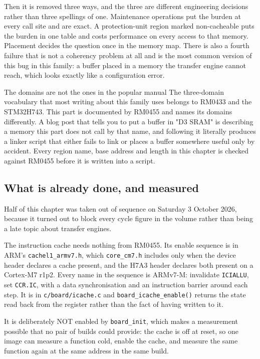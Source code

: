 Then it is removed three ways, and the three are different engineering
decisions rather than three spellings of one. Maintenance operations put the
burden at every call site and are exact. A protection-unit region marked
non-cacheable puts the burden in one table and costs performance on every
access to that memory. Placement decides the question once in the memory map.
There is also a fourth failure that is not a coherency problem at all and is
the most common version of this bug in this family: a buffer placed in a memory
the transfer engine cannot reach, which looks exactly like a configuration
error.

\begin{note}{The domains are not the ones in the popular manual}
The three-domain vocabulary that most writing about this family uses belongs to
RM0433 and the STM32H743. This part is documented by RM0455 and names its
domains differently. A blog post that tells you to put a buffer in "D3 SRAM"
is describing a memory this part does not call by that name, and following it
literally produces a linker script that either fails to link or places a buffer
somewhere useful only by accident. Every region name, base address and length
in this chapter is checked against RM0455 before it is written into a script.
\end{note}

\subsection*{What is already done, and measured}

Half of this chapter was taken out of sequence on Saturday 3 October 2026, because
it turned out to block every cycle figure in the volume rather than being a late
topic about transfer engines.

The instruction cache needs nothing from RM0455. Its enable sequence is in ARM's
\texttt{cachel1\_armv7.h}, which \texttt{core\_cm7.h} includes only when the device
header declares a cache present, and the H7A3 header declares both present on a
Cortex-M7 r1p2. Every name in the sequence is ARMv7-M: invalidate \texttt{ICIALLU},
set \texttt{CCR.IC}, with a data synchronisation and an instruction barrier around
each step. It is in \texttt{c/board/icache.c} and \texttt{board\_icache\_enable()}
returns the state read back from the register rather than the fact of having
written to it.

It is deliberately NOT enabled by \texttt{board\_init}, which makes a measurement
possible that no pair of builds could provide: the cache is off at reset, so one
image can measure a function cold, enable the cache, and measure the same function
again at the same address in the same build.

